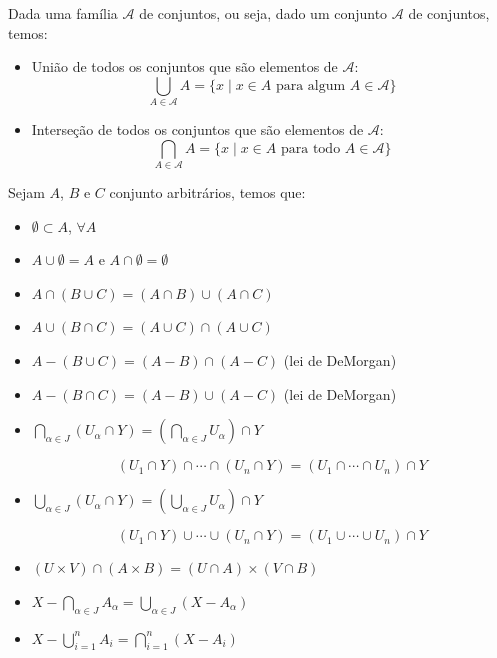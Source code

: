  Dada uma família $\mathcal{A}$ de conjuntos, ou seja, dado um conjunto $\mathcal{A}$ de conjuntos, temos:
 \begin{itemize}
 \item União de todos os conjuntos que são elementos de $\mathcal{A}$:
 $$\bigcup_{A \in \mathcal{A}} A = \{x\mid x \in A \text{ para algum } A \in \mathcal{A}\}$$
 \item Interseção de todos os conjuntos que são elementos de $\mathcal{A}$:
 $$\bigcap_{A \in \mathcal{A}} A = \{x\mid x \in A \text{ para todo } A \in \mathcal{A}\}$$
\end{itemize}

\begin{prop}
Sejam $A$, $B$ e $C$ conjunto arbitrários, temos que:
\begin{itemize}
 \item $\emptyset \subset A$, $\forall A$
 \item $A \cup \emptyset= A$ e $A \cap \emptyset= \emptyset$
 \item $A \cap (B \cup C) = (A \cap B) \cup (A \cap C)$
 \item $A \cup (B \cap C) = (A \cup C) \cap (A \cup C)$
 \item $A - (B \cup C) = (A - B) \cap (A - C)$ (lei de DeMorgan)
 \item $A - (B \cap C) = (A - B) \cup (A - C)$ (lei de DeMorgan)
 \item $\bigcap_{\alpha \in J}(U_{\alpha} \cap Y) = (\bigcap_{\alpha \in J} U_{\alpha}) \cap Y$

  $$(U_1 \cap Y) \cap \cdots \cap (U_n \cap Y) = (U_1 \cap \cdots \cap U_n) \cap Y$$

 \item $\bigcup_{\alpha \in J}(U_{\alpha} \cap Y) = (\bigcup_{\alpha \in J} U_{\alpha}) \cap Y$

 $$(U_1 \cap Y) \cup \cdots \cup (U_n \cap Y) = (U_1 \cup \cdots \cup U_n) \cap Y$$

 \item $(U \times V) \cap (A \times B) = (U \cap A) \times (V \cap B)$

 \item $X - \bigcap_{\alpha \in J} A_{\alpha} = \bigcup_{\alpha \in J}(X - A_{\alpha})$

 \item $X - \bigcup_{i= 1}^{n} A_i = \bigcap_{i = 1}^{n}(X - A_i)$

\end{itemize}
\end{prop}
